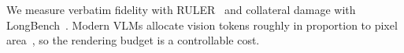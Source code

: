 We measure verbatim fidelity with RULER~\cite{hsieh2024ruler} and collateral damage with LongBench~\cite{bai2024longbench}.
Modern VLMs allocate vision tokens roughly in proportion to pixel area~\cite{wang2024qwen2vl,bai2025qwen25vl,bai2025qwen3vl,chen2024internvl15,li2025llavaonevision}, so the rendering budget is a controllable cost.
